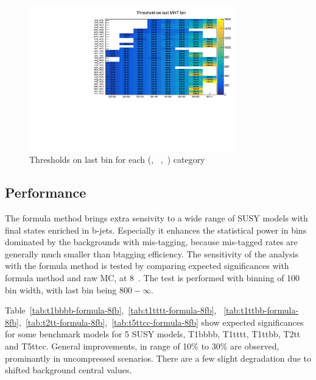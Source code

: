 \begin{figure}[h!]
  \centering
  \includegraphics[width=0.8\textwidth]{figures/btagformula/Ewk_lastMhtBin.pdf} 
  \caption{\label{fig:lastMhtBin} Thresholds on last \mht bin for each (\njet,
  ~\nb,~\scalht) category}
\end{figure}


\subsection{Performance}
The formula method brings extra sensivity to a wide range of SUSY models with final
states enriched in b-jets.
Especially it enhances the statistical power in bins dominated by the backgrounds 
with mis-tagging, because mis-tagged rates are generally much smaller than 
btagging efficiency. The sensitivity of the analysis with the formula method is 
tested by comparing expected significances with formula method and raw MC, 
at 8~\ifb. The test is performed with \mht binning of 100 \gev bin 
width, with last \mht bin being $800-\infty$.

Table~\ref{tab:t1bbbb-formula-8fb},~\ref{tab:t1tttt-formula-8fb},
~\ref{tab:t1ttbb-formula-8fb},~\ref{tab:t2tt-formula-8fb},~\ref{tab:t5ttcc-formula-8fb} 
show expected significances for some benchmark models for 5 SUSY models, T1bbbb, 
T1tttt, T1ttbb, T2tt and T5ttcc. General improvements, in range of 10\% to 30\%
 are observed, prominantly in uncompressed scenarios. There are a few slight 
 degradation due to shifted background central values.

%
\begin{figure}

%



\end{figure}













